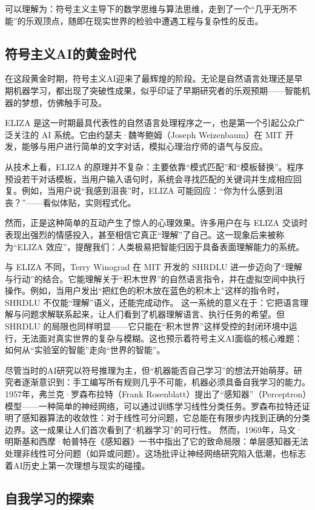 可以理解为：符号主义主导下的数学思维与算法思维，走到了一个“几乎无所不能”的乐观顶点，随即在现实世界的检验中遭遇工程与复杂性的反击。

\subsection{符号主义AI的黄金时代}

在这段黄金时期，符号主义AI迎来了最辉煌的阶段。无论是自然语言处理还是早期机器学习，都出现了突破性成果，似乎印证了早期研究者的乐观预期——智能机器的梦想，仿佛触手可及。

ELIZA 是这一时期最具代表性的自然语言处理程序之一，也是第一个引起公众广泛关注的 AI 系统。它由约瑟夫·魏岑鲍姆（Joseph Weizenbaum）在 MIT 开发，能够与用户进行简单的文字对话，模拟心理治疗师的语气与反应。  

从技术上看，ELIZA 的原理并不复杂：主要依靠“模式匹配”和“模板替换”。程序预设若干对话模板，当用户输入语句时，系统会寻找匹配的关键词并生成相应回复。例如，当用户说“我感到沮丧”时，ELIZA 可能回应：“你为什么感到沮丧？”——看似体贴，实则程式化。  

然而，正是这种简单的互动产生了惊人的心理效果。许多用户在与 ELIZA 交谈时表现出强烈的情感投入，甚至相信它真正“理解”了自己。这一现象后来被称为“ELIZA 效应”，提醒我们：人类极易把智能归因于具备表面理解能力的系统。

与 ELIZA 不同，Terry Winograd 在 MIT 开发的 SHRDLU 进一步迈向了“理解与行动”的结合。它能理解关于“积木世界”的自然语言指令，并在虚拟空间中执行操作。例如，当用户发出“把红色的积木放在蓝色的积木上”这样的指令时，SHRDLU 不仅能“理解”语义，还能完成动作。  
这一系统的意义在于：它把语言理解与问题求解联系起来，让人们看到了机器理解语言、执行任务的希望。但 SHRDLU 的局限也同样明显——它只能在“积木世界”这样受控的封闭环境中运行，无法面对真实世界的复杂与模糊。这也预示着符号主义AI面临的核心难题：如何从“实验室的智能”走向“世界的智能”。

尽管当时的AI研究以符号推理为主，但“机器能否自己学习”的想法开始萌芽。研究者逐渐意识到：手工编写所有规则几乎不可能，机器必须具备自我学习的能力。  
1957年，弗兰克·罗森布拉特（Frank Rosenblatt）提出了“感知器”（Perceptron）模型——一种简单的神经网络，可以通过训练学习线性分类任务。罗森布拉特还证明了感知器算法的收敛性：对于线性可分问题，它总能在有限步内找到正确的分类边界。这一成果让人们首次看到了“机器学习”的可行性。  
然而，1969年，马文·明斯基和西摩·帕普特在《感知器》一书中指出了它的致命局限：单层感知器无法处理非线性可分问题（如异或问题）。这场批评让神经网络研究陷入低潮，也标志着AI历史上第一次理想与现实的碰撞。

\subsection{自我学习的探索}

